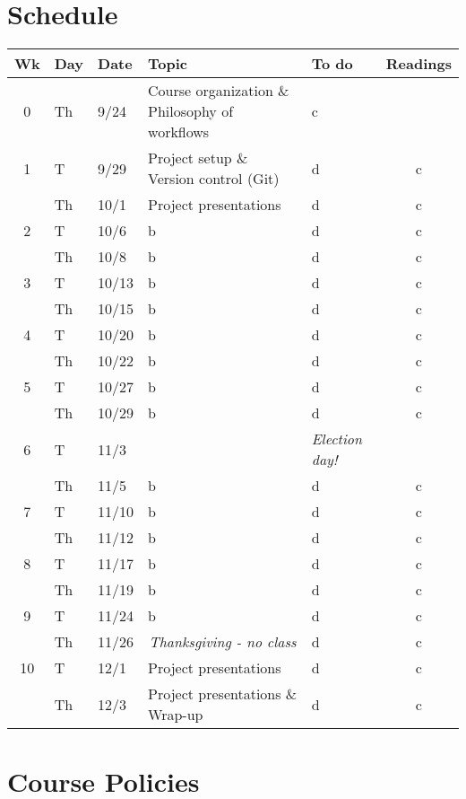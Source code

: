 \documentclass[10pt]{article}
\begin{document}
\section*{Schedule}
\begin{tabular}{cllllc}%
	\hline\hline
	Wk  & Day & Date &Topic & To do & Readings\\ 
	\hline
	\hline
	0 &  Th		& 9/24 		& Course organization \& Philosophy of workflows	& c & \\
	1 & T  		& 9/29 		&  Project setup \& Version control (Git) & d & c\\
		& Th 	& 10/1 		& Project presentations	 & d & c\\
	2 &  T 		& 10/6		& b					&  d & c\\
		&  Th 	& 10/8 		&b&  d & c\\
	3 &  T		 & 10/13 	& b&  d& c\\
		&  Th 	& 10/15		& b&  d& c\\
	4 &  T 		& 10/20		& b& d & c\\
		&  Th 	& 10/22		& b& d & c\\
	5 &  T 		& 10/27		& b&  d& c\\
		&  Th 	& 10/29		& b& d & c\\
	6 &  T 		& 11/3		& &  \textit{Election day!} \\
		&  Th	& 11/5		 & b&  d& c\\
	7 &  T 		& 11/10		& b&  d& c\\
		&  Th 	& 11/12		& b& d & c\\
	8 &  T 		& 11/17		& b& d & c\\
		&  Th 	& 11/19		& b& d & c\\
	9 &  T 	& 11/24		& b&  d& c\\
		&  Th 	& 11/26		& \multicolumn{1}{c}{ \textit{Thanksgiving - no class} }& d & c \\
	10 &  T 	& 12/1		& Project presentations & d & c\\
	&  Th 	& 12/3		&  Project presentations \& Wrap-up & d& c \\
	\hline
	\hline
\end{tabular}

\pagebreak

\section*{Course Policies}
\end{document}
